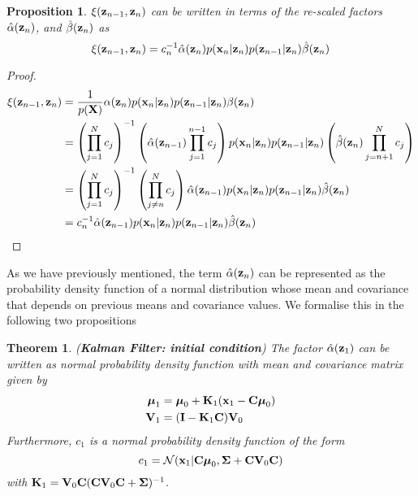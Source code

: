 \documentclass[11pt]{article}
\numberwithin{equation}{section}
\newcommand{\x}{{\bf x}}
\newcommand{\z}{{\bf z}}
\newcommand{\N}{\mathcal{N}}
\newtheorem{proposition}{Proposition}[section]
\newtheorem{theorem}{Theorem}[section]
\begin{document}
\begin{proposition} \label{prop:xi-rewrite}
	$\xi(\z_{n-1}, \z_n)$ can be written in terms of the re-scaled factors $\hat\alpha(\z_n)$, and $\hat\beta(\z_n)$ as
	\begin{equation}
		\xi(\z_{n-1}, \z_{n}) = c_n^{-1}\hat\alpha(\z_n)p(\x_n \vert \z_n) p(\z_{n-1}\vert \z_n)\hat\beta(\z_n)
	\end{equation}
\end{proposition}

\begin{proof}
	\begin{align}
		\xi(\z_{n-1}, \z_n) &= \frac{1}{p({\bf X})} \alpha(\z_n) p(\x_n \vert \z_n) p(\z_{n-1} \vert \z_n) \beta(\z_n) \\
		&= \left(\prod_{j=1}^N c_j\right)^{-1} \left(\hat\alpha(\z_{n-1}) \prod_{j=1}^{n-1} c_j\right)p(\x_n \vert \z_n) p(\z_{n-1} \vert \z_n)\left(\hat\beta(\z_n) \prod_{j={n+1}}^N c_j\right) \\
		&= \left(\prod_{j=1}^N c_j\right)^{-1} \left(\prod_{j\neq n}^N c_j\right) \hat\alpha(\z_{n-1}) p(\x_n \vert \z_n) p(\z_{n-1} \vert \z_n) \hat\beta(\z_n)\\
		&= c_n^{-1}\hat\alpha(\z_{n-1}) p(\x_n \vert \z_n) p(\z_{n-1} \vert \z_n) \hat\beta(\z_n)
	\end{align}
\end{proof}


As we have previously mentioned, the term $\hat\alpha(\z_n)$ can be represented as the probability density function of a normal distribution whose mean and covariance that depends on previous means and covariance values. We formalise this in the following two propositions

\begin{theorem} (\textbf{Kalman Filter: initial condition}) \label{theorem:alpha-forward-equations-1}
	The factor $\hat\alpha(\z_1)$ can be written as normal probability density function with mean and covariance matrix given by
	\begin{align}
		\boldsymbol{\mu}_1 &= \boldsymbol{\mu}_0 + {\bf K}_1(\x_1 -{\bf C}\boldsymbol\mu_0)\\
		{\bf V}_1 &=  ({\bf I} - {\bf K}_1{\bf C}){\bf V}_0
	\end{align}
	Furthermore, $c_1$ is a normal probability density function of the form
	\begin{equation}
		c_1 = \N(\x_1\vert {\bf C}\boldsymbol\mu_0, \boldsymbol\Sigma + {\bf C} {\bf V}_0 {\bf C})
	\end{equation}
	with ${\bf K}_1 = {\bf V}_0{\bf C}({\bf C} {\bf V}_0 {\bf C} + \boldsymbol\Sigma)^{-1}$.
\end{theorem}
\end{document}
